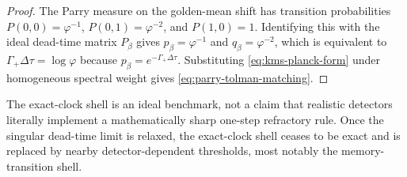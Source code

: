 \begin{proof}
The Parry measure on the golden-mean shift has transition probabilities $P(0,0)=\varphi^{-1}$, $P(0,1)=\varphi^{-2}$, and $P(1,0)=1$. Identifying this with the ideal dead-time matrix $P_\beta$ gives $p_\beta=\varphi^{-1}$ and $q_\beta=\varphi^{-2}$, which is equivalent to $\Gamma_+\Delta\tau=\log\varphi$ because $p_\beta=e^{-\Gamma_+\Delta\tau}$. Substituting \eqref{eq:kms-planck-form} under homogeneous spectral weight gives \eqref{eq:parry-tolman-matching}.
\end{proof}

\begin{remark}\label{rem:exact-clock-attainability}
The exact-clock shell is an ideal benchmark, not a claim that realistic detectors literally implement a mathematically sharp one-step refractory rule. Once the singular dead-time limit is relaxed, the exact-clock shell ceases to be exact and is replaced by nearby detector-dependent thresholds, most notably the memory-transition shell.
\end{remark}

